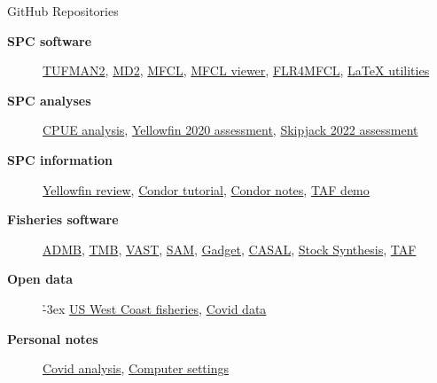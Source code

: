 \documentclass[aspectratio=169]{beamer}
\begin{document}

\begin{frame}{GitHub Repositories}\small
  \begin{description}
    \item[\bf\green SPC software]
    \href{https://github.com/PacificCommunity/tufman2}
    {\darkblue TUFMAN2},
    \href{https://github.com/PacificCommunity/ofp-md2}
    {\darkblue MD2},
    \href{https://github.com/PacificCommunity/ofp-sam-mfcl}
    {\darkblue MFCL},
    \href{https://github.com/PacificCommunity/ofp-sam-mfcl-viewer}
    {\darkblue MFCL viewer},
    \href{https://github.com/PacificCommunity/ofp-sam-flr4mfcl}
    {\darkblue FLR4MFCL},
    \href{https://github.com/PacificCommunity/ofp-sam-latex-utils}
    {\darkblue LaTeX utilities}\\[4ex]
    \item[\bf\green SPC analyses]
    \href{https://github.com/PacificCommunity/ofp-sam-cpue2021}
    {\darkblue CPUE analysis},
    \href{https://github.com/PacificCommunity/ofp-sam-yft-2020-runs}
    {\darkblue Yellowfin 2020 assessment},
    \href{https://github.com/PacificCommunity/ofp-sam-skj22}
    {\darkblue Skipjack 2022 assessment}\\[4ex]
    \item[\bf\green SPC information]
    \href{https://github.com/PacificCommunity/ofp-sam-yft-review}
    {\darkblue Yellowfin review},
    \href{https://github.com/PacificCommunity/ofp-sam-htcondor}
    {\darkblue Condor tutorial},
    \href{https://github.com/PacificCommunity/ofp-sam-institutional-memory}
    {\darkblue Condor notes},
    \href{https://github.com/PacificCommunity/ofp-sam-taf-demo}
    {\darkblue TAF demo}\\[4ex]
    \item[\bf\green Fisheries software]
    \href{https://github.com/admb-project/admb}{\darkblue ADMB},
    \href{https://github.com/kaskr/adcomp}{\darkblue TMB},
    \href{https://github.com/James-Thorson-NOAA/VAST}{\darkblue VAST},
    \href{https://github.com/fishfollower/SAM}{\darkblue SAM},
    \href{https://github.com/gadget-framework/gadget2}{\darkblue Gadget},
    \href{https://github.com/NIWAFisheriesModelling/CASAL2}{\darkblue CASAL},
    \href{https://github.com/nmfs-stock-synthesis/stock-synthesis}
    {\darkblue Stock Synthesis},
    \href{https://github.com/ices-tools-prod/TAF}{\darkblue TAF}\\[4ex]
    \item[\bf\green Open data~~~]\h{-3ex}
    \href{https://github.com/cfree14/wcfish}{\darkblue US West Coast fisheries},
    \href{https://github.com/CSSEGISandData/COVID-19}
    {\darkblue Covid data}\\[4ex]
    \item[\bf\green Personal notes]
    \href{https://github.com/arni-magnusson/corona}{\darkblue Covid analysis},
    \href{https://github.com/arni-magnusson/dot}
    {\darkblue Computer settings}\\[1ex]
  \end{description}
\end{frame}
\end{document}
